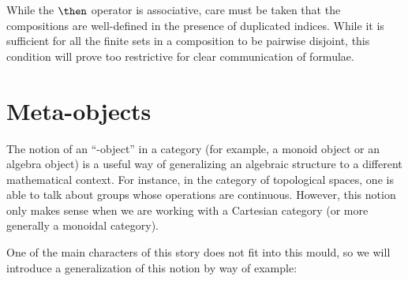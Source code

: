 \begin{remark}
        While the $\then$ operator is associative, care must be taken that the
        compositions are well-defined in the presence of duplicated indices.
        While it is sufficient for all the finite sets in a composition to be
        pairwise disjoint, this condition will prove too restrictive for clear
        communication of formulae.
\end{remark}

\section{Meta-objects}\label{sec:meta-objects}

The notion of an \enquote{-object} in a category (for example, a monoid object
or an algebra object) is a useful way of generalizing an algebraic structure to
a different mathematical context. For instance, in the category of topological
spaces, one is able to talk about groups whose operations are continuous.
However, this notion only makes sense when we are working with a Cartesian
category (or more generally a monoidal category).

One of the main characters of this story does not fit into this mould, so we
will introduce a generalization of this notion by way of example:

